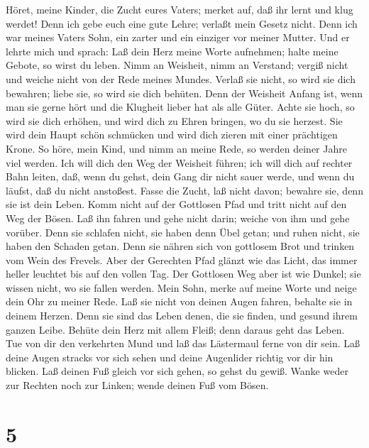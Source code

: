  Höret, meine Kinder, die Zucht eures Vaters; merket auf,
daß ihr lernt und klug werdet!  Denn ich gebe euch eine gute
Lehre; verlaßt mein Gesetz nicht.  Denn ich war meines
Vaters Sohn, ein zarter und ein einziger vor meiner Mutter. 
Und er lehrte mich und sprach: Laß dein Herz meine Worte aufnehmen;
halte meine Gebote, so wirst du leben.  Nimm an Weisheit,
nimm an Verstand; vergiß nicht und weiche nicht von der Rede meines
Mundes.  Verlaß sie nicht, so wird sie dich bewahren; liebe
sie, so wird sie dich behüten.  Denn der Weisheit Anfang
ist, wenn man sie gerne hört und die Klugheit lieber hat als alle Güter.
 Achte sie hoch, so wird sie dich erhöhen, und wird dich zu
Ehren bringen, wo du sie herzest.  Sie wird dein Haupt schön
schmücken und wird dich zieren mit einer prächtigen Krone. 
So höre, mein Kind, und nimm an meine Rede, so werden deiner Jahre viel
werden.  Ich will dich den Weg der Weisheit führen; ich
will dich auf rechter Bahn leiten,  daß, wenn du gehst,
dein Gang dir nicht sauer werde, und wenn du läufst, daß du nicht
anstoßest.  Fasse die Zucht, laß nicht davon; bewahre sie,
denn sie ist dein Leben.  Komm nicht auf der Gottlosen Pfad
und tritt nicht auf den Weg der Bösen.  Laß ihn fahren und
gehe nicht darin; weiche von ihm und gehe vorüber.  Denn
sie schlafen nicht, sie haben denn Übel getan; und ruhen nicht, sie
haben den Schaden getan.  Denn sie nähren sich von
gottlosem Brot und trinken vom Wein des Frevels.  Aber der
Gerechten Pfad glänzt wie das Licht, das immer heller leuchtet bis auf
den vollen Tag.  Der Gottlosen Weg aber ist wie Dunkel; sie
wissen nicht, wo sie fallen werden.  Mein Sohn, merke auf
meine Worte und neige dein Ohr zu meiner Rede.  Laß sie
nicht von deinen Augen fahren, behalte sie in deinem Herzen.
 Denn sie sind das Leben denen, die sie finden, und gesund
ihrem ganzen Leibe.  Behüte dein Herz mit allem Fleiß; denn
daraus geht das Leben.  Tue von dir den verkehrten Mund und
laß das Lästermaul ferne von dir sein.  Laß deine Augen
stracks vor sich sehen und deine Augenlider richtig vor dir hin blicken.
 Laß deinen Fuß gleich vor sich gehen, so gehst du gewiß.
 Wanke weder zur Rechten noch zur Linken; wende deinen Fuß
vom Bösen.

\hypertarget{section-4}{%
\section{5}\label{section-4}}

